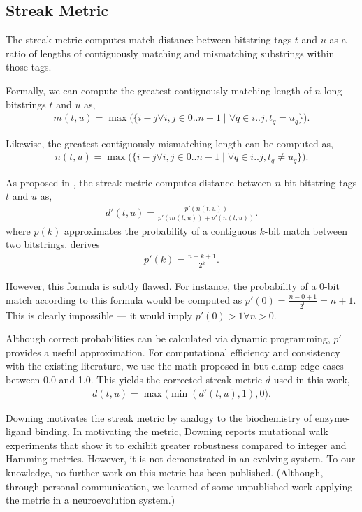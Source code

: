\subsection{Streak Metric} \label{sec:streak}

The streak metric computes match distance between bitstring tags $t$ and $u$ as a ratio of lengths of contiguously matching and mismatching substrings within those tags.

Formally, we can compute the greatest contiguously-matching length of $n$-long bitstrings $t$ and $u$ as,
\begin{align*}
m(t, u) = \max\Big(\{i - j \forall i, j \in 0..n-1 \mid \forall q \in i..j, t_q = u_q \}\Big).
\end{align*}

Likewise, the greatest contiguously-mismatching length can be computed as,
\begin{align*}
n(t, u) = \max\Big(\{i - j \forall i, j \in 0..n-1 \mid \forall q \in i..j, t_q \neq u_q \}\Big).
\end{align*}

As proposed in \cite{downing2015intelligence}, the streak metric computes distance between $n$-bit bitstring tags $t$ and $u$ as,
\begin{align*}
d'(t, u)
= \frac{p'(n(t,u))}{p'(m(t,u)) + p'(n(t,u))}.
\end{align*}
where $p(k)$ approximates the probability of a contiguous $k$-bit match between two bitstrings.
\cite{downing2015intelligence} derives
\begin{align*}
p'(k)
= \frac{n - k + 1}{2^k}.
\end{align*}

However, this formula is subtly flawed.
For instance, the probability of a $0$-bit match according to this formula would be computed as $p'(0) = \frac{n - 0 + 1}{2^0} = n + 1$.
This is clearly impossible --- it would imply $p'(0) > 1 \forall n > 0$.

Although correct probabilities can be calculated via dynamic programming, $p'$ provides a useful approximation.
For computational efficiency and consistency with the existing literature, we use the math proposed in \citep{downing2015intelligence} but clamp edge cases between 0.0 and 1.0.
This yields the corrected streak metric $d$ used in this work,
\begin{align*}
d(t, u) = \max\Big( \min( d'(t, u), 1), 0 \Big).
\end{align*}

Downing motivates the streak metric by analogy to the biochemistry of enzyme-ligand binding.
In motivating the metric, Downing reports mutational walk experiments that show it to exhibit greater robustness compared to integer and Hamming metrics.
However, it is not demonstrated in an evolving system.
To our knowledge, no further work on this metric has been published.
(Although, through personal communication, we learned of some unpublished work applying the metric in a neuroevolution system.)
